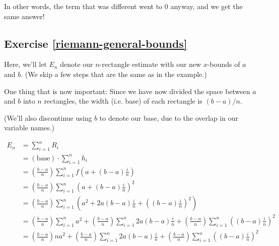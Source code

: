 \documentclass{book}
\begin{document}
In other words, the term that was different went to 0 anyway, and we get the same answer! 


\subsection{Exercise \ref{riemann-general-bounds}}

Here, we'll let $E_n$ denote our $n$-rectangle estimate with our new $x$-bounds of $a$ and $b$. (We skip a few steps that are the same as in the example.)

One thing that is now important: Since we have now divided the space between $a$ and $b$ into $n$ rectangles, the width (i.e. base) of each rectangle is $(b-a)/n$. 

(We'll also discontinue using $b$ to denote our base, due to the overlap in our variable names.)

\begin{align*}
E_n &= \sum_{i=1}^n R_i \\
&= (\text{base}) \cdot \sum_{i=1}^n h_i \\
&= \left(\frac{b-a}{n}\right) \sum_{i=1}^n f\left(a + (b-a)\frac{i}{n}\right) \\
&= \left(\frac{b-a}{n}\right) \sum_{i=1}^n \left(a + (b-a)\frac{i}{n}\right)^2 \\
&= \left(\frac{b-a}{n}\right) \sum_{i=1}^n \left(a^2 + 2a(b-a)\frac{i}{n} + \left((b-a)\frac{i}{n}\right)^2\right) \\
&= \left(\frac{b-a}{n}\right) \sum_{i=1}^n a^2 + \left(\frac{b-a}{n}\right) \sum_{i=1}^n 2a(b-a)\frac{i}{n} + \left(\frac{b-a}{n}\right) \sum_{i=1}^n \left((b-a)\frac{i}{n}\right)^2 \\
&= \left(\frac{b-a}{n}\right) n a^2 + \left(\frac{b-a}{n}\right) \sum_{i=1}^n 2a(b-a)\frac{i}{n} + \left(\frac{b-a}{n}\right) \sum_{i=1}^n \left((b-a)\frac{i}{n}\right)^2 \\
\end{align*}
\end{document}
